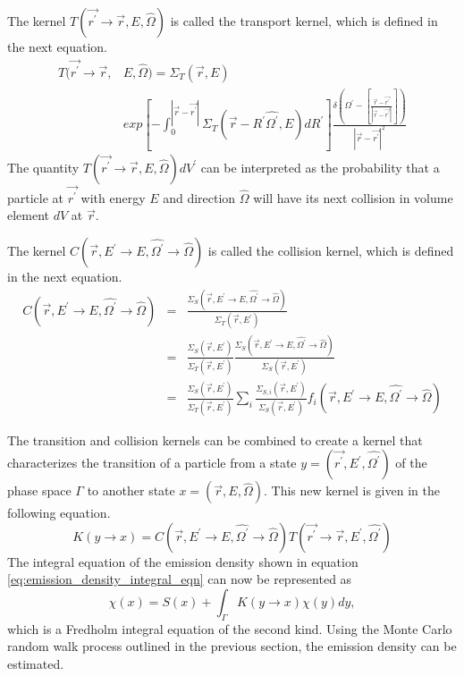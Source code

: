 The kernel $T(\vec{r^{'}} \to \vec{r},E,\hat{\Omega})$ is called the transport
kernel, which is defined in the next equation.
\begin{equation}
  \begin{split}
    T(\vec{r^{'}} \to \vec{r},&E,\hat{\Omega}) = \Sigma_T(\vec{r},E) \\
    &exp\left[-\int_0^{|\vec{r} - \vec{r^{'}}|} 
      \Sigma_T(\vec{r}-R^{'}\hat{\Omega^{'}},E)dR^{'} \right] 
    \frac{\delta \left(\Omega^{'} - \left[\frac{\vec{r} - \vec{r^{'}}}
        {|\vec{r} - \vec{r^{'}}|}\right]\right)}
    {|\vec{r} - \vec{r^{'}}|^2} 
  \end{split}
\end{equation}
The quantity $T(\vec{r^{'}} \to \vec{r},E,\hat{\Omega})dV^{'}$ can be interpreted
as the probability that a particle at $\vec{r^{'}}$ with energy $E$ and 
direction $\hat{\Omega}$ will have its next collision in volume element $dV$
at $\vec{r}$.

The kernel $C(\vec{r},E^{'} \to E,\hat{\Omega^{'}} \to \hat{\Omega})$ is called
the collision kernel, which is defined in the next equation.
\begin{eqnarray}
  C(\vec{r},E^{'} \to E,\hat{\Omega^{'}} \to \hat{\Omega}) & = & 
  \frac{\Sigma_S(\vec{r},E^{'} \to E,\hat{\Omega^{'}} \to \hat{\Omega})}
       {\Sigma_T(\vec{r},E^{'})} \\
  & = & \frac{\Sigma_S(\vec{r},E^{'})}{\Sigma_T(\vec{r},E^{'})}
       \frac{\Sigma_S(\vec{r},E^{'} \to E,\hat{\Omega^{'}} \to \hat{\Omega})}
            {\Sigma_S(\vec{r},E^{'})} \nonumber \\
  & = & \frac{\Sigma_S(\vec{r},E^{'})}{\Sigma_T(\vec{r},E^{'})} \sum_i
        \frac{\Sigma_{S,i}(\vec{r},E^{'})}{\Sigma_S(\vec{r},E^{'})}
        f_i(\vec{r},E^{'} \to E,\hat{\Omega^{'}} \to \hat{\Omega}) \nonumber
\end{eqnarray}

The transition and collision kernels can be combined to create a kernel that
characterizes the transition of a particle from a state 
$y = (\vec{r^{'}},E^{'},\hat{\Omega^{'}})$ of the phase space $\Gamma$ to another 
state $x = (\vec{r},E,\hat{\Omega})$. This new kernel is given in the following 
equation.
\begin{equation}
  K(y \to x) =
  C(\vec{r},E^{'} \to E,\hat{\Omega^{'}} \to \hat{\Omega})
    T(\vec{r^{'}} \to \vec{r},E^{'},\hat{\Omega^{'}})
\end{equation}
The integral equation of the emission density shown in equation 
\ref{eq:emission_density_integral_eqn} can now be represented as
\begin{equation*}
  \chi(x) = S(x) + \int_{\Gamma} K(y \to x)\chi(y)dy,
\end{equation*}
which is a Fredholm integral equation of the second kind. Using the Monte Carlo
random walk process outlined in the previous section, the emission density
can be estimated. 

